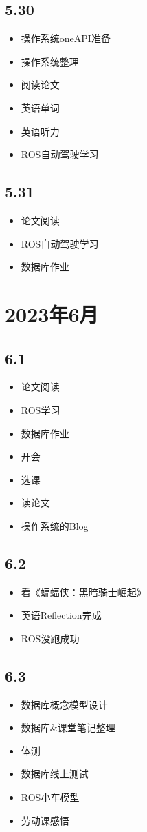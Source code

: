 \documentclass[UTF8]{ctexart}
\begin{document}
\subsection*{5.30}
\begin{itemize}
    \item 操作系统oneAPI准备
    \item 操作系统整理
    \item 阅读论文
    \item 英语单词
    \item 英语听力
    \item ROS自动驾驶学习
\end{itemize}
\subsection*{5.31}
\begin{itemize}
    \item 论文阅读
    \item ROS自动驾驶学习
    \item 数据库作业
\end{itemize}
\section*{2023年6月}
\subsection*{6.1}
\begin{itemize}
    \item 论文阅读
    \item ROS学习
    \item 数据库作业
    \item 开会
    \item 选课
    \item 读论文
    \item 操作系统的Blog
\end{itemize}
\subsection*{6.2}
\begin{itemize}
    \item 看《蝙蝠侠：黑暗骑士崛起》
    \item 英语Reflection完成
    \item ROS没跑成功
\end{itemize}
\subsection*{6.3}
\begin{itemize}
    \item 数据库概念模型设计
    \item 数据库\&课堂笔记整理
    \item 体测
    \item 数据库线上测试
    \item ROS小车模型
    \item 劳动课感悟
\end{itemize}
\end{document}
